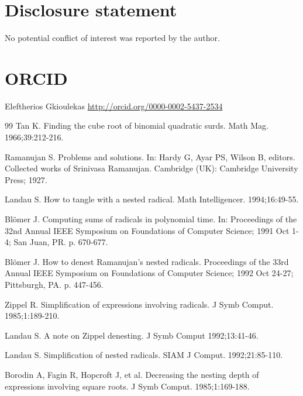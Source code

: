 \documentclass[11pt,letterpaper]{article}
\begin{document}
\section*{Disclosure statement}
No potential conflict of interest was reported by the author.

\section*{ORCID}
Eleftherios Gkioulekas \href{http://orcid.org/0000-0002-5437-2534}{http://orcid.org/0000-0002-5437-2534}

\begin{thebibliography}{99}
 Tan K. Finding the cube root of binomial quadratic surds. Math Mag. 1966;39:212-216.

 Ramanujan S. Problems and solutions. In: Hardy G, Ayar PS, Wilson B, editors. Collected works of Srinivasa Ramanujan. Cambridge (UK): Cambridge University Press; 1927.

 Landau S. How to tangle with a nested radical. Math Intelligencer. 1994;16:49-55.

 Bl\"omer J. Computing sums of radicals in polynomial time. In: Proceedings of the 32nd Annual IEEE Symposium on Foundations of Computer Science; 1991 Oct 1-4; San Juan, PR. p. 670-677.

 Bl\"omer J. How to denest Ramanujan's nested radicals. Proceedings of the 33rd Annual IEEE Symposium on Foundations of Computer Science; 1992 Oct 24-27; Pittsburgh, PA. p. 447-456.

 Zippel R. Simplification of expressions involving radicals. J Symb Comput. 1985;1:189-210.

 Landau S. A note on Zippel denesting. J Symb Comput 1992;13:41-46.

 Landau S. Simplification of nested radicals. SIAM J Comput. 1992;21:85-110.

 Borodin A, Fagin R, Hopcroft J, et al. Decreasing the nesting depth of expressions involving square roots. J Symb Comput. 1985;1:169-188.
\end{thebibliography}
\end{document}
